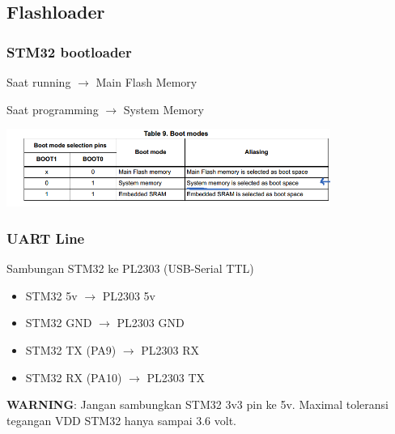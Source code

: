 \documentclass[table,dvipsnames]{beamer}
\begin{document}
	\subsection{Flashloader}
	\begin{frame}
	\frametitle{STM32 bootloader}
		\begin{exampleblock}{}
			Saat running $\rightarrow$ Main Flash Memory
		\end{exampleblock}
		\begin{exampleblock}{}
			Saat programming $\rightarrow$ System Memory
		\end{exampleblock}

		\begin{center}
			\includegraphics[width=300pt]{images/bootloader}
		\end{center}
	\end{frame}

	\begin{frame}
		\frametitle{UART Line}
		\begin{exampleblock}{}
			Sambungan STM32 ke PL2303 (USB-Serial TTL)
			\begin{itemize}
				\item STM32 5v $\rightarrow$ PL2303 5v
				\item STM32 GND $\rightarrow$ PL2303 GND
				\item STM32 TX (PA9) $\rightarrow$ PL2303 RX
				\item STM32 RX (PA10) $\rightarrow$ PL2303 TX
			\end{itemize}
		\end{exampleblock}

		\begin{exampleblock}{}
			\textbf{WARNING}: Jangan sambungkan STM32 3v3 pin ke 5v.
			Maximal toleransi tegangan VDD STM32 hanya sampai 3.6 volt.
		\end{exampleblock}
	\end{frame}
\end{document}
